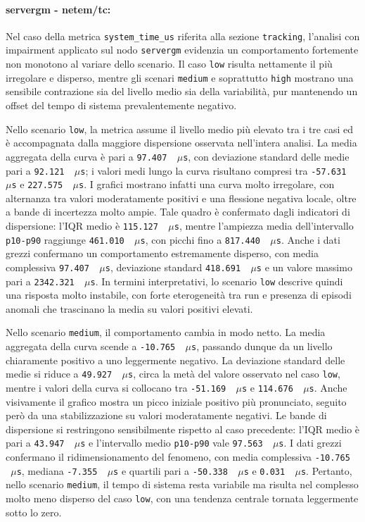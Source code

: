 \paragraph*{servergm - netem/tc:}
Nel caso della metrica \texttt{system\_time\_us} riferita alla sezione \texttt{tracking},
l'analisi con impairment applicato sul nodo \texttt{servergm} evidenzia un comportamento
fortemente non monotono al variare dello scenario. Il caso \texttt{low} risulta nettamente
il più irregolare e disperso, mentre gli scenari \texttt{medium} e soprattutto \texttt{high}
mostrano una sensibile contrazione sia del livello medio sia della variabilità, pur
mantenendo un offset del tempo di sistema prevalentemente negativo.

Nello scenario \texttt{low}, la metrica assume il livello medio più elevato tra i
tre casi ed è accompagnata dalla maggiore dispersione osservata nell'intera analisi.
La media aggregata della curva è pari a \texttt{97.407 \,$\mu$s}, con deviazione
standard delle medie pari a \texttt{92.121 \,$\mu$s}; i valori medi lungo la
curva risultano compresi tra \texttt{-57.631 \,$\mu$s} e \texttt{227.575 \,$\mu$s}.
I grafici mostrano infatti una curva molto irregolare, con alternanza tra valori
moderatamente positivi e una flessione negativa locale, oltre a bande di incertezza
molto ampie. Tale quadro è confermato dagli indicatori di dispersione: l'IQR medio
è \texttt{115.127 \,$\mu$s}, mentre l'ampiezza media dell'intervallo \texttt{p10-p90}
raggiunge \texttt{461.010 \,$\mu$s}, con picchi fino a \texttt{817.440 \,$\mu$s}.
Anche i dati grezzi confermano un comportamento estremamente disperso, con media complessiva
\texttt{97.407 \,$\mu$s}, deviazione standard \texttt{418.691 \,$\mu$s} e un
valore massimo pari a \texttt{2342.321 \,$\mu$s}. In termini interpretativi, lo scenario
\texttt{low} descrive quindi una risposta molto instabile, con forte eterogeneità
tra run e presenza di episodi anomali che trascinano la media su valori positivi elevati.

Nello scenario \texttt{medium}, il comportamento cambia in modo netto. La media
aggregata della curva scende a \texttt{-10.765 \,$\mu$s}, passando dunque da un
livello chiaramente positivo a uno leggermente negativo. La deviazione standard delle
medie si riduce a \texttt{49.927 \,$\mu$s}, circa la metà del valore osservato nel
caso \texttt{low}, mentre i valori della curva si collocano tra \texttt{-51.169 \,$\mu$s}
e \texttt{114.676 \,$\mu$s}. Anche visivamente il grafico mostra un picco
iniziale positivo più pronunciato, seguito però da una stabilizzazione su valori moderatamente
negativi. Le bande di dispersione si restringono sensibilmente rispetto al caso
precedente: l'IQR medio è pari a \texttt{43.947 \,$\mu$s} e l'intervallo medio
\texttt{p10-p90} vale \texttt{97.563 \,$\mu$s}. I dati grezzi confermano il ridimensionamento
del fenomeno, con media complessiva \texttt{-10.765 \,$\mu$s}, mediana \texttt{-7.355
\,$\mu$s} e quartili pari a \texttt{-50.338 \,$\mu$s} e \texttt{0.031 \,$\mu$s}.
Pertanto, nello scenario \texttt{medium}, il tempo di sistema resta variabile ma risulta
nel complesso molto meno disperso del caso \texttt{low}, con una tendenza centrale
tornata leggermente sotto lo zero.

